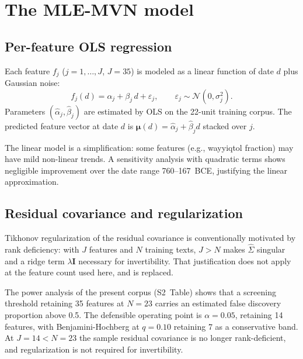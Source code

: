 \documentclass[10pt,letterpaper]{article}
\newcommand{\muvec}{\boldsymbol{\mu}}
\begin{document}
\section*{The MLE-MVN model}

\subsection*{Per-feature OLS regression}

Each feature $f_j$ ($j = 1, \ldots, J$, $J = 35$) is modeled as a linear
function of date $d$ plus Gaussian noise:
%
\begin{equation}
  f_j(d) = \alpha_j + \beta_j \, d + \varepsilon_j, \qquad
  \varepsilon_j \sim \mathcal{N}(0, \sigma_j^2).
  \label{eq:ols}
\end{equation}
%
Parameters $(\hat{\alpha}_j, \hat{\beta}_j)$ are estimated by OLS on the
22-unit training corpus.  The predicted feature vector at date $d$ is
$\muvec(d) = \hat{\alpha}_j + \hat{\beta}_j d$ stacked over $j$.

The linear model is a simplification: some features (e.g., wayyiqtol
fraction) may have mild non-linear trends.  A sensitivity analysis with
quadratic terms shows negligible improvement over the date range
760--167~BCE, justifying the linear approximation.

\subsection*{Residual covariance and regularization}

Tikhonov regularization of the residual covariance is conventionally
motivated by rank deficiency: with $J$ features and $N$ training
texts, $J > N$ makes $\hat{\Sigma}$ singular and a ridge term
$\lambda \mathbf{I}$ necessary for invertibility.  That justification does not apply at
the feature count used here, and is replaced.

The power analysis of the present corpus (S2~Table) shows that a screening
threshold retaining 35 features at $N = 23$ carries an estimated false
discovery proportion above 0.5.  The defensible operating point is
$\alpha = 0.05$, retaining 14 features, with Benjamini-Hochberg at
$q = 0.10$ retaining 7 as a conservative band.  At $J = 14 < N = 23$ the
sample residual covariance is no longer rank-deficient, and regularization
is not required for invertibility.
\end{document}
